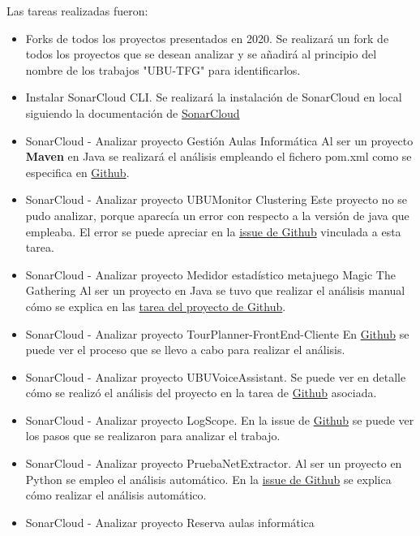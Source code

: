 Las tareas realizadas fueron:
\begin{itemize}
	\tightlist
	\item Forks de todos los proyectos presentados en 2020.
		Se realizará un fork de todos los proyectos que se desean analizar y se añadirá al principio del nombre de los trabajos "UBU-TFG" para identificarlos. 
	\item Instalar SonarCloud CLI.
		Se realizará la instalación de SonarCloud en local siguiendo la documentación de \href{https://sonarcloud.io/documentation/analysis/scan/sonarscanner/}{SonarCloud} 
	\item SonarCloud - Analizar proyecto Gestión Aulas Informática
		Al ser un proyecto \textbf{Maven} en Java se realizará el análisis empleando el fichero pom.xml como se especifica en \href{https://github.com/dbo1001/Gestor-TFG-2021/issues/70}{Github}.
	\item SonarCloud - Analizar proyecto UBUMonitor Clustering
		Este proyecto no se pudo analizar, porque aparecía un error con respecto a la versión de java que empleaba. El error se puede apreciar en la \href{https://github.com/dbo1001/Gestor-TFG-2021/issues/72}{issue de Github} vinculada a esta tarea. 
	\item SonarCloud - Analizar proyecto Medidor estadístico metajuego Magic The Gathering
		Al ser un proyecto en Java se tuvo que realizar el análisis manual cómo se explica en las \href{https://github.com/dbo1001/Gestor-TFG-2021/issues/71}{tarea del proyecto de Github}.
	\item SonarCloud - Analizar proyecto TourPlanner-FrontEnd-Cliente
		En \href{https://github.com/dbo1001/Gestor-TFG-2021/issues/74}{Github} se puede ver el proceso que se llevo a cabo para realizar el análisis.
	\item SonarCloud - Analizar proyecto UBUVoiceAssistant.
		Se puede ver en detalle cómo se realizó el análisis del proyecto en la tarea de \href{https://github.com/dbo1001/Gestor-TFG-2021/issues/76}{Github} asociada.
	\item SonarCloud - Analizar proyecto LogScope.
		En la issue de \href{https://github.com/dbo1001/Gestor-TFG-2021/issues/75}{Github} se puede ver los pasos que se realizaron para analizar el trabajo.
	\item SonarCloud - Analizar proyecto PruebaNetExtractor.
		Al ser un proyecto en Python se empleo el análisis automático. En la \href{https://github.com/dbo1001/Gestor-TFG-2021/issues/79}{issue de Github} se explica cómo realizar el análisis automático.
	\item SonarCloud - Analizar proyecto Reserva aulas informática

\end{itemize}
